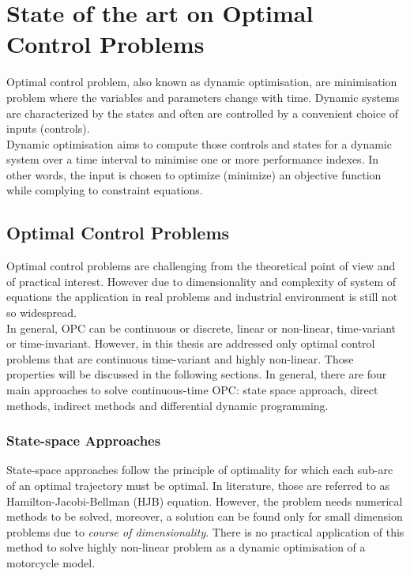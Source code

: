 \section{State of the art on Optimal Control Problems} 

Optimal control problem, also known as dynamic optimisation, are minimisation problem where the variables and parameters change with time. Dynamic systems are characterized by the states and often are controlled by a convenient choice of inputs (controls).\\
Dynamic optimisation aims to compute those controls and states for a dynamic system over a time interval to minimise one or more performance indexes. In other words, the input is chosen to optimize (minimize) an objective function while complying to constraint equations.

\subsection{Optimal Control Problems}
Optimal control problems are challenging from the theoretical point of view and of practical interest. However due to dimensionality and complexity of system of equations the application in real problems and industrial environment is still not so widespread.\\
In general, OPC can be continuous or discrete, linear or non-linear, time-variant or time-invariant. However, in this thesis are addressed only optimal control problems that are continuous time-variant and highly non-linear. Those properties will be discussed in the following sections. %
In general, there are four main approaches to solve continuous-time OPC: state space approach, direct methods, indirect methods and differential dynamic programming.


\subsubsection{State-space Approaches}

State-space approaches follow the principle of optimality for which each sub-arc of an optimal trajectory must be optimal. In literature, those are referred to as Hamilton-Jacobi-Bellman (HJB) equation. However, the problem needs numerical methods to be solved, moreover, a solution can be found only for small dimension problems due to \textit{course of dimensionality}. There is no practical application of this method to solve highly non-linear problem as a dynamic optimisation of a motorcycle model.

